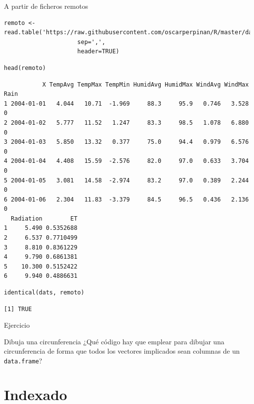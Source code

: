 \documentclass[xcolor={usenames,svgnames,dvipsnames}]{beamer}
\begin{document}
\begin{frame}[fragile,label={sec:org9e195da}]{A partir de ficheros remotos}
 \lstset{language=r,label= ,caption= ,captionpos=b,numbers=none}
\begin{lstlisting}
remoto <- read.table('https://raw.githubusercontent.com/oscarperpinan/R/master/data/aranjuez.csv',
                     sep=',',
                     header=TRUE)
\end{lstlisting}

\lstset{language=r,label= ,caption= ,captionpos=b,numbers=none}
\begin{lstlisting}
head(remoto)
\end{lstlisting}

\begin{verbatim}
           X TempAvg TempMax TempMin HumidAvg HumidMax WindAvg WindMax Rain
1 2004-01-01   4.044   10.71  -1.969     88.3     95.9   0.746   3.528    0
2 2004-01-02   5.777   11.52   1.247     83.3     98.5   1.078   6.880    0
3 2004-01-03   5.850   13.32   0.377     75.0     94.4   0.979   6.576    0
4 2004-01-04   4.408   15.59  -2.576     82.0     97.0   0.633   3.704    0
5 2004-01-05   3.081   14.58  -2.974     83.2     97.0   0.389   2.244    0
6 2004-01-06   2.304   11.83  -3.379     84.5     96.5   0.436   2.136    0
  Radiation        ET
1     5.490 0.5352688
2     6.537 0.7710499
3     8.810 0.8361229
4     9.790 0.6861381
5    10.300 0.5152422
6     9.940 0.4886631
\end{verbatim}

\lstset{language=r,label= ,caption= ,captionpos=b,numbers=none}
\begin{lstlisting}
identical(dats, remoto)
\end{lstlisting}

\begin{verbatim}
[1] TRUE
\end{verbatim}
\end{frame}


\begin{frame}[fragile,label={sec:org9cf788e}]{Ejercicio}
 \begin{block}{Dibuja una circunferencia}
¿Qué código hay que emplear para dibujar una circunferencia de forma
que todos los vectores implicados sean columnas de un \texttt{data.frame}?
\end{block}
\end{frame}


\section{Indexado}
\label{sec:orgd9c1ecf}
\end{document}
